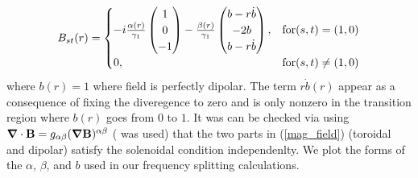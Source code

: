 \begin{equation}\label{mag_field}
B_{st}(r) = 
\begin{cases}
-i \frac{\alpha(r)}{\gamma_{1}} \left(\begin{matrix} 1 \\ 0 \\ -1 \end{matrix}\right)  - \frac{\beta(r)}{\gamma_{1}} \left(\begin{matrix} b-r\dot{b} \\ -2b \\ b-r\dot{b} \end{matrix}\right), & \text{for} (s,t) = (1,0) \\
0, & \text{for} (s,t) \neq (1,0)
\end{cases}
\end{equation}
where $b(r)=1$ where field is perfectly dipolar. The term $r\dot{b}(r)$ appear as a consequence of fixing the diveregence to zero and is only nonzero in the transition region where $b(r)$ goes from $0$ to $1$. It was can be checked via using $\bm{\nabla} \cdot \mathbf{B} = g_{\alpha\beta} (\bm{\nabla}\mathbf{B})^{\alpha\beta}$ (\cite{GSH_repo} was used) that the two parts in (\ref{mag_field}) (toroidal and dipolar) satisfy the solenoidal condition independenlty. We plot the forms of the $\alpha$, $\beta$, and $b$ used in our frequency splitting calculations.

